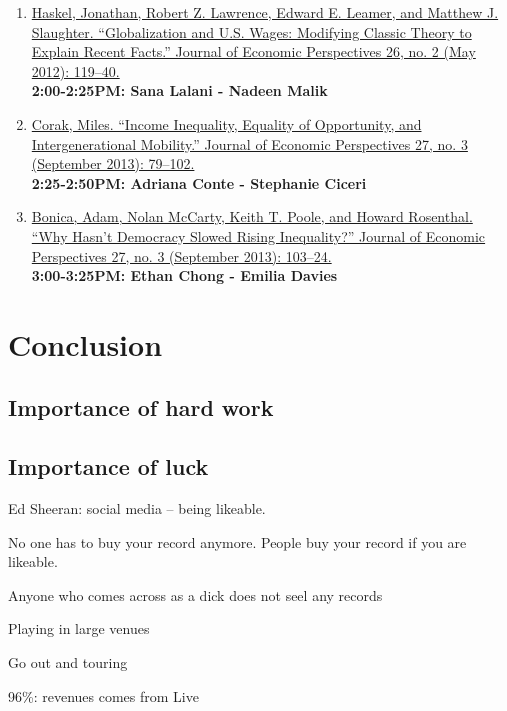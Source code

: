 \documentclass[]{book}
\theoremstyle{definition}
\theoremstyle{definition}
\theoremstyle{definition}
\theoremstyle{remark}
\begin{document}
\begin{enumerate}
\def\labelenumi{\arabic{enumi}.}
\setcounter{enumi}{4}
\item
  \href{https://doi.org/10.1257/jep.26.2.119}{Haskel, Jonathan, Robert
  Z. Lawrence, Edward E. Leamer, and Matthew J. Slaughter.
  ``Globalization and U.S. Wages: Modifying Classic Theory to Explain
  Recent Facts.'' Journal of Economic Perspectives 26, no. 2 (May 2012):
  119--40.}\\
  \textbf{2:00-2:25PM: Sana Lalani - Nadeen Malik}
\item
  \href{https://doi.org/10.1257/jep.27.3.79}{Corak, Miles. ``Income
  Inequality, Equality of Opportunity, and Intergenerational Mobility.''
  Journal of Economic Perspectives 27, no. 3 (September 2013):
  79--102.}\\
  \textbf{2:25-2:50PM: Adriana Conte - Stephanie Ciceri}
\item
  \href{https://doi.org/10.1257/jep.27.3.103}{Bonica, Adam, Nolan
  McCarty, Keith T. Poole, and Howard Rosenthal. ``Why Hasn't Democracy
  Slowed Rising Inequality?'' Journal of Economic Perspectives 27, no. 3
  (September 2013): 103--24.}\\
  \textbf{3:00-3:25PM: Ethan Chong - Emilia Davies}
\end{enumerate}

\chapter{Conclusion}\label{concluding-superstars}

\section{Importance of hard work}\label{importance-of-hard-work}

\section{Importance of luck}\label{importance-of-luck}

Ed Sheeran: social media -- being likeable.

No one has to buy your record anymore. People buy your record if you are
likeable.

Anyone who comes across as a dick does not seel any records

Playing in large venues

Go out and touring

96\%: revenues comes from Live
\end{document}
